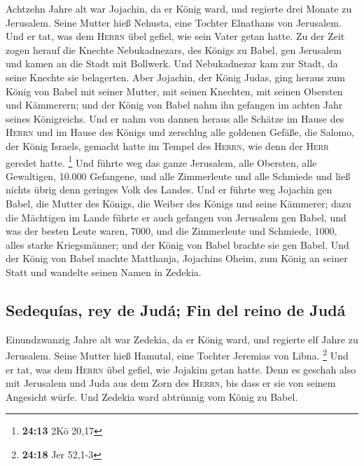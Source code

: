  Achtzehn Jahre alt war Jojachin, da er König ward, und
regierte drei Monate zu Jerusalem. Seine Mutter hieß Nehusta, eine
Tochter Elnathans von Jerusalem.  Und er tat, was dem
\textsc{Herrn} übel gefiel, wie sein Vater getan hatte. 
Zu der Zeit zogen herauf die Knechte Nebukadnezars, des Königs zu Babel,
gen Jerusalem und kamen an die Stadt mit Bollwerk.  Und
Nebukadnezar kam zur Stadt, da seine Knechte sie belagerten.
 Aber Jojachin, der König Judas, ging heraus zum König
von Babel mit seiner Mutter, mit seinen Knechten, mit seinen Obersten
und Kämmerern; und der König von Babel nahm ihn gefangen im achten Jahr
seines Königreichs.  Und er nahm von dannen heraus alle
Schätze im Hause des \textsc{Herrn} und im Hause des Königs und
zerschlug alle goldenen Gefäße, die Salomo, der König Israels, gemacht
hatte im Tempel des \textsc{Herrn}, wie denn der \textsc{Herr} geredet
hatte. \footnote{\textbf{24:13} 2Kö 20,17}  Und führte
weg das ganze Jerusalem, alle Obersten, alle Gewaltigen, 10.000
Gefangene, und alle Zimmerleute und alle Schmiede und ließ nichts übrig
denn geringes Volk des Landes.  Und er führte weg
Jojachin gen Babel, die Mutter des Königs, die Weiber des Königs und
seine Kämmerer; dazu die Mächtigen im Lande führte er auch gefangen von
Jerusalem gen Babel,  und was der besten Leute waren,
7000, und die Zimmerleute und Schmiede, 1000, alles starke Kriegsmänner;
und der König von Babel brachte sie gen Babel.  Und der
König von Babel machte Matthanja, Jojachins Oheim, zum König an seiner
Statt und wandelte seinen Namen in Zedekia.

\hypertarget{sedequuxedas-rey-de-juduxe1-fin-del-reino-de-juduxe1}{%
\subsection{Sedequías, rey de Judá; Fin del reino de
Judá}\label{sedequuxedas-rey-de-juduxe1-fin-del-reino-de-juduxe1}}

 Einundzwanzig Jahre alt war Zedekia, da er König ward,
und regierte elf Jahre zu Jerusalem. Seine Mutter hieß Hamutal, eine
Tochter Jeremias von Libna. \footnote{\textbf{24:18} Jer 52,1-3}
 Und er tat, was dem \textsc{Herrn} übel gefiel, wie
Jojakim getan hatte.  Denn es geschah also mit Jerusalem
und Juda aus dem Zorn des \textsc{Herrn}, bis dass er sie von seinem
Angesicht würfe. Und Zedekia ward abtrünnig vom König zu Babel.

